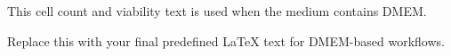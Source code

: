 This cell count and viability text is used when the medium contains DMEM.

Replace this with your final predefined LaTeX text for DMEM-based workflows.
